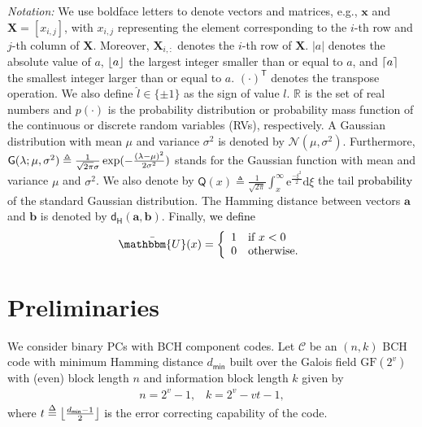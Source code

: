 \documentclass[journal]{IEEEtran}
\newcommand{\Q}{\mathsf{Q}}
\newcommand{\G}{\mathsf{G}}
\renewcommand{\a}{\boldsymbol{a}}
\renewcommand{\b}{\boldsymbol{b}}
\newcommand{\nc}{n}
\newcommand{\kc}{k}
\newcommand{\dmin}{d_\mathsf{min}}
\newcommand{\ham}{\mathsf{d}_\mathsf{H}}
\newcommand{\GL}{\textcolor{black}}
\newcommand{\AG}{\textcolor{black}}
\newcommand{\GLC}[1]{\textcolor{black}{\textbf{\textit{#1}}}}
\let\originalleft\left
\let\originalright\right
\renewcommand{\left}{\mathopen{}\mathclose\bgroup\originalleft}
\renewcommand{\right}{\aftergroup\egroup\originalright}
\begin{document}
\medskip

\noindent \emph{Notation:} We use boldface letters to denote vectors
and matrices, e.g., $\boldsymbol{x}$  and $\boldsymbol{X}=[x_{i,j}]$, with $x_{i,j}$ representing the element corresponding to the $i$-th row and $j$-th column of $\boldsymbol{X}$. 
Moreover, $\boldsymbol{X}_{i,:}$ denotes the $i$-th row of $\boldsymbol{X}$.   
$|a|$ denotes the absolute value of $a$,
$\left\lfloor a \right\rfloor$ the largest integer smaller than or equal to $a$, and $\left\lceil a \right\rceil$ the smallest integer larger than or equal to $a$. $(\cdot)^{\mathsf{T}}$ denotes the transpose operation. We also define $\hat l \in \{\pm1\}$ as the sign of value $l$.  $\mathbb{R}$ is the set of real numbers and $p(\cdot)$ is the probability distribution or probability mass function of the continuous or discrete random variables (RVs), respectively. 
A Gaussian distribution with mean $\mu$ and variance $\sigma^2$ is denoted by $\mathcal{N}(\mu ,\sigma^2)$. Furthermore, %
$\G (\lambda ;\mu ,{\sigma ^2}) \triangleq \frac{1}{{\sqrt {2\pi } \sigma }}\exp ( - \frac{{{{\left( {\lambda  - \mu } \right)}^2}}}{{2{\sigma ^2}}})$ stands for the Gaussian function with mean and variance $\mu$ and $\sigma^2$. We also denote by $\Q(x)\triangleq\frac{1}{\sqrt{2\pi}}\int_x^\infty \mathrm{e}^{\frac{-\xi^2}{2}}\mathrm{d}\xi$ the tail \AG{probability} of the standard Gaussian distribution. The Hamming distance between vectors $\a$ and $\b$ is denoted by $\ham(\a,\b)$. Finally, \GL{we define}
\begin{align*}
\bar{\mathbbm{U}}(x)=  \left\{ 
\begin{array}{ll}
1 & \text{if } x<0\\
0 & \text{otherwise}.
\end{array}
\right.
\end{align*}

\section{Preliminaries}
\label{sys_mod} 

We consider binary PCs with BCH component codes. Let $\mathcal{C}$ be an $(\nc,\kc)$ BCH code with minimum Hamming distance $\dmin$ built over the Galois field $\text{GF}(2^v)$ with (even) block length $\nc$ and information block length $\kc$ given by
\begin{align}
\nc=2^v-1, \;\;\; \kc=2^v-vt-1, \label{k_formula}
\end{align} 
where $t \buildrel \Delta \over =  \left\lfloor {\frac{{{\dmin} - 1}}{2}} \right\rfloor$ \AG{is} the error correcting capability of the code.
\end{document}
